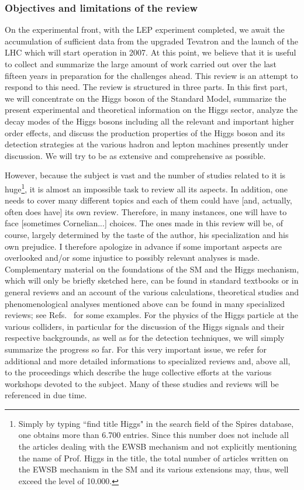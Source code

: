 \subsubsection*{Objectives and limitations of the review}

On the experimental front, with the LEP experiment completed, we await the
accumulation of sufficient data from the upgraded Tevatron and the launch of
the LHC which will start operation in 2007. At this point, we believe that it
is useful to collect and summarize the large amount of work carried out over
the last fifteen years in preparation for the challenges ahead. This review is
an attempt to respond to this need. The review is structured in three parts. 
In this first part, we will concentrate on the Higgs boson of the Standard
Model, summarize the present experimental and theoretical information on the
Higgs sector, analyze the decay modes of the Higgs bosons including all the
relevant and important higher order effects, and discuss the production
properties of the Higgs boson and its detection strategies at the various
hadron and lepton machines presently under discussion. We will try to be 
as extensive and comprehensive as possible.\s 

However, because the subject is vast and the number of studies related to it is
huge\footnote{Simply by typing ``find title Higgs" in the search field of the
Spires database, one obtains more than 6.700 entries. Since this number does
not include all the articles dealing with the EWSB mechanism and not explicitly
mentioning the name of Prof. Higgs in the title, the total number of articles
written on the EWSB mechanism in the SM and its various extensions may, thus,
well exceed the level of 10.000.}, it is almost an impossible task to review
all its aspects. In addition, one needs to cover many different topics and each
of them could have [and, actually, often does have] its own review.  Therefore,
in many instances, one will have to face [sometimes Cornelian...] choices. The
ones made in this review  will be, of course, largely determined by the taste
of the author, his specialization and his own prejudice. I therefore apologize
in advance if some important aspects are overlooked and/or some injustice to
possibly relevant analyses is made.  Complementary material on the foundations
of the SM and the Higgs mechanism, which will only be briefly sketched here,
can be found in standard textbooks \cite{BOOKS} or in general reviews
\cite{SM-REVIEWS,Reviews-Higgs} and an account of the various calculations,
theoretical studies and phenomenological analyses mentioned above can be found
in many specialized reviews; see
Refs.~\cite{RCreviewEW,Reviews-AD,Review-Michael,RCreviewQCD,Review-CH} for
some examples. For the physics of the Higgs particle at the various colliders,
in particular for the discussion of the Higgs signals and their respective
backgrounds, as well as for the detection techniques, we  will simply summarize
the progress so far.  For this very important issue, we refer for additional
and more detailed informations to specialized reviews and, above all, to the
proceedings which describe the huge collective efforts at the various workshops
devoted to the subject.  Many of these studies and reviews will be referenced
in due time.  

